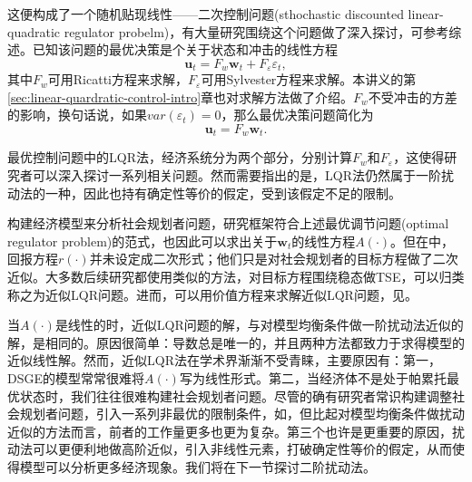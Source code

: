\begin{remark}
这便构成了一个随机贴现线性——二次控制问题(sthochastic discounted linear-quadratic regulator probelm)，有大量研究围绕这个问题做了深入探讨，可参考综述\cite{Anderson:1996tq,Hansen:2004va,Hansen:2013bv}。已知该问题的最优决策是个关于状态和冲击的线性方程
\begin{equation*}
  \bm{u}_t = F_{w} \bm{w}_t + F_{\varepsilon} \varepsilon_t,
\end{equation*}
其中$F_w$可用Ricatti方程来求解，$F_{\varepsilon}$可用Sylvester方程来求解\citep[pp.182-183,202-205]{Anderson:1996tq}。本讲义的第\ref{sec:linear-quardratic-control-intro}章也对求解方法做了介绍。$F_w$不受冲击的方差的影响，换句话说，如果$var(\varepsilon_t)=0$，那么最优决策问题简化为
\begin{equation*}
  \bm{u}_t = F_{w} \bm{w}_t.
\end{equation*}

最优控制问题中的LQR法，经济系统分为两个部分，分别计算$F_w$和$F_{\varepsilon}$，这使得研究者可以深入探讨一系列相关问题。然而需要指出的是，LQR法仍然属于一阶扰动法的一种，因此也持有确定性等价的假定，受到该假定不足的限制。

\cite{Kydland:1982cd}构建经济模型来分析社会规划者问题，研究框架符合上述最优调节问题(optimal regulator problem)的范式，也因此可以求出关于$\bm{w}_t$的线性方程$A(\cdot)$。但在\cite{Kydland:1982cd}中，回报方程$r(\cdot)$并未设定成二次形式；他们只是对社会规划者的目标方程做了二次近似。大多数后续研究都使用类似的方法，对目标方程围绕稳态做TSE，可以归类称之为近似LQR问题。进而，可以用价值方程来求解近似LQR问题，见\cite{DiazGimenez:1999vx}。

当$A(\cdot)$是线性的时，近似LQR问题的解，与对模型均衡条件做一阶扰动法近似的解，是相同的。原因很简单：导数总是唯一的，并且两种方法都致力于求得模型的近似线性解。然而，近似LQR法在学术界渐渐不受青睐，主要原因有：第一，DSGE的模型常常很难将$A(\cdot)$写为线性形式。第二，当经济体不是处于帕累托最优状态时，我们往往很难构建社会规划者问题。尽管的确有研究者常识构建调整社会规划者问题，引入一系列非最优的限制条件，如\cite{Benigno:2003bg}，但比起对模型均衡条件做扰动近似的方法而言，前者的工作量更多也更为复杂。第三个也许是更重要的原因，扰动法可以更便利地做高阶近似，引入非线性元素，打破确定性等价的假定，从而使得模型可以分析更多经济现象。我们将在下一节探讨二阶扰动法。
\end{remark}

